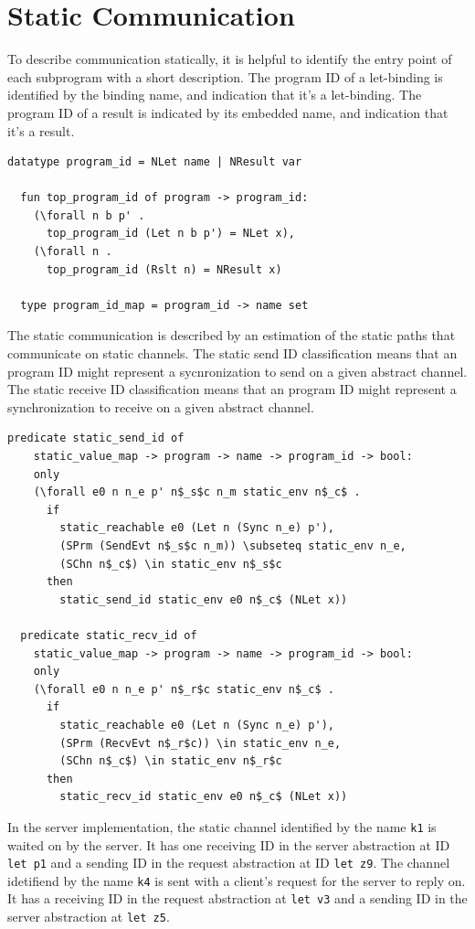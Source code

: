 \documentclass{article}
\begin{document}
\section{Static Communication}
To describe communication statically, it is helpful to identify the entry
point of each subprogram with a short description. The program ID of a let-binding is
identified by the binding name, and indication that it's a let-binding. The program ID
of a result is indicated by its embedded name, and indication that it's a result.

\begin{lstlisting}[language=logic, mathescape]
  datatype program_id = NLet name | NResult var

  fun top_program_id of program -> program_id:
    (\forall n b p' . 
      top_program_id (Let n b p') = NLet x),
    (\forall n . 
      top_program_id (Rslt n) = NResult x)

  type program_id_map = program_id -> name set

\end{lstlisting}

The static communication is described by an estimation of the static paths that communicate on
static channels.
The static send ID classification means that an program ID might represent a
sycnronization to send on a given abstract channel.
The static receive ID classification means that an program ID might represent a
synchronization to receive on a given abstract channel. 

\begin{lstlisting}[language=logic, mathescape]
  predicate static_send_id of
    static_value_map -> program -> name -> program_id -> bool:
    only
    (\forall e0 n n_e p' n$_s$c n_m static_env n$_c$ .
      if
        static_reachable e0 (Let n (Sync n_e) p'),
        (SPrm (SendEvt n$_s$c n_m)) \subseteq static_env n_e, 
        (SChn n$_c$) \in static_env n$_s$c
      then
        static_send_id static_env e0 n$_c$ (NLet x))

  predicate static_recv_id of
    static_value_map -> program -> name -> program_id -> bool:
    only
    (\forall e0 n n_e p' n$_r$c static_env n$_c$ .
      if
        static_reachable e0 (Let n (Sync n_e) p'),
        (SPrm (RecvEvt n$_r$c)) \in static_env n_e, 
        (SChn n$_c$) \in static_env n$_r$c 
      then
        static_recv_id static_env e0 n$_c$ (NLet x))
  \end{lstlisting}


In the server implementation, the static channel identified by the name \lstinline{k1} is waited on
by the server.  It has
one receiving ID in the server abstraction
at ID \lstinline[language=sugar_lang]{let p1} and a sending ID
in the request abstraction at ID \lstinline[language=sugar_lang]{let z9}.
The channel idetifiend by the name \lstinline{k4} is sent with a client's request for
the server to reply on. It has a receiving ID in the request abstraction at
\lstinline[language=sugar_lang]{let v3} and a sending ID in the server abstraction at
\lstinline[language=sugar_lang]{let z5}.
\end{document}
